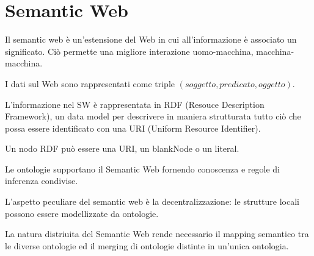 \chapter{Semantic Web}
\label{chp:semantic-web}

Il semantic web è un'estensione del Web in cui all'informazione è associato un significato. Ciò permette una migliore interazione uomo-macchina, macchina-macchina.

I dati sul Web sono rappresentati come triple $(soggetto,predicato,oggetto)$.

L’informazione nel SW è rappresentata in RDF (Resouce Description Framework), un data model per descrivere
in maniera strutturata tutto ciò che possa essere identificato con una URI (Uniform Resource Identifier).

Un nodo RDF può essere una URI, un blankNode o un literal.

Le ontologie supportano il Semantic Web fornendo conoscenza e regole di inferenza condivise.

L’aspetto peculiare del semantic web è la decentralizzazione: le strutture locali possono essere modellizzate da ontologie.

La natura distriuita del Semantic Web rende necessario il mapping semantico tra le diverse ontologie ed il merging di ontologie distinte in un'unica ontologia.